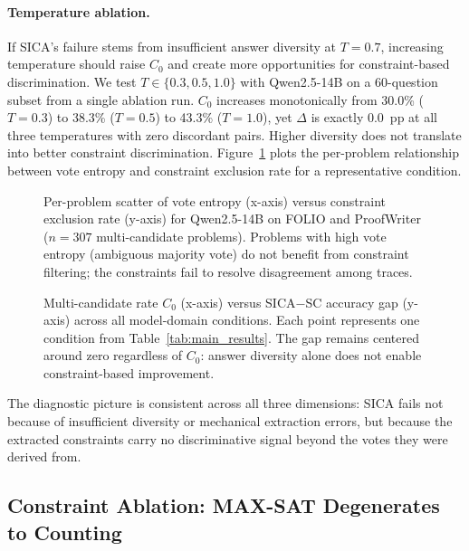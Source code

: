 \paragraph{Temperature ablation.} If SICA's failure stems from insufficient answer diversity at $T = 0.7$, increasing temperature should raise $C_0$ and create more opportunities for constraint-based discrimination. We test $T \in \{0.3, 0.5, 1.0\}$ with Qwen2.5-14B on a 60-question subset from a single ablation run. $C_0$ increases monotonically from 30.0\% ($T=0.3$) to 38.3\% ($T=0.5$) to 43.3\% ($T=1.0$), yet $\Delta$ is exactly 0.0~pp at all three temperatures with zero discordant pairs. Higher diversity does not translate into better constraint discrimination. Figure~\ref{fig:capability_scatter} plots the per-problem relationship between vote entropy and constraint exclusion rate for a representative condition.

\begin{figure}[t]
\centering
\caption{Per-problem scatter of vote entropy (x-axis) versus constraint exclusion rate (y-axis) for Qwen2.5-14B on FOLIO and ProofWriter ($n=307$ multi-candidate problems). Problems with high vote entropy (ambiguous majority vote) do not benefit from constraint filtering; the constraints fail to resolve disagreement among traces.}
\label{fig:capability_scatter}
\end{figure}

\begin{figure}[t]
\centering
\caption{Multi-candidate rate $C_0$ (x-axis) versus SICA$-$SC accuracy gap (y-axis) across all model-domain conditions. Each point represents one condition from Table~\ref{tab:main_results}. The gap remains centered around zero regardless of $C_0$: answer diversity alone does not enable constraint-based improvement.}
\label{fig:operating_regime}
\end{figure}

The diagnostic picture is consistent across all three dimensions: SICA fails not because of insufficient diversity or mechanical extraction errors, but because the extracted constraints carry no discriminative signal beyond the votes they were derived from.


\subsection{Constraint Ablation: MAX-SAT Degenerates to Counting}
\label{sec:ablation}

